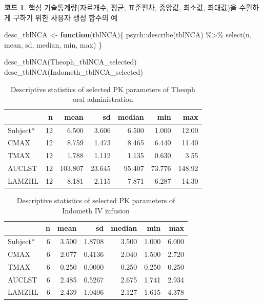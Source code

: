 \documentclass[
  11pt,
  krantz2, a4paper, twoside]{krantz}
\newenvironment{Shaded}{\begin{snugshade}}{\end{snugshade}}
\newcommand{\ControlFlowTok}[1]{\textcolor[rgb]{0.13,0.29,0.53}{\textbf{#1}}}
\newcommand{\FunctionTok}[1]{\textcolor[rgb]{0.00,0.00,0.00}{#1}}
\newcommand{\NormalTok}[1]{#1}
\newcommand{\OtherTok}[1]{\textcolor[rgb]{0.56,0.35,0.01}{#1}}
\newcommand{\SpecialCharTok}[1]{\textcolor[rgb]{0.00,0.00,0.00}{#1}}
\theoremstyle{definition}
\theoremstyle{definition}
\newtheorem{example}{코드}[chapter]
\theoremstyle{definition}
\theoremstyle{definition}
\theoremstyle{remark}
\begin{document}
\begin{example}
\protect\hypertarget{exm:desctblnca}{}{\label{exm:desctblnca} }핵심 기술통계량(자료개수, 평균, 표준편차, 중앙값, 최소값, 최대값)을 수월하게 구하기 위한 사용자 생성 함수의 예
\end{example}
\vspace{-2ex}

\begin{Shaded}
\begin{Highlighting}[]
\NormalTok{desc\_tblNCA }\OtherTok{\textless{}{-}} \ControlFlowTok{function}\NormalTok{(tblNCA)\{}
\NormalTok{  psych}\SpecialCharTok{::}\FunctionTok{describe}\NormalTok{(tblNCA) }\SpecialCharTok{\%\textgreater{}\%}
    \FunctionTok{select}\NormalTok{(n, mean, sd, median, min, max)}
\NormalTok{\}}
\end{Highlighting}
\end{Shaded}

\begin{Shaded}
\begin{Highlighting}[]
\FunctionTok{desc\_tblNCA}\NormalTok{(Theoph\_tblNCA\_selected)}
\FunctionTok{desc\_tblNCA}\NormalTok{(Indometh\_tblNCA\_selected)}
\end{Highlighting}
\end{Shaded}

\begin{table}

\caption{\label{tab:theodesc}Descriptive statistics of selected PK parameters of Theoph oral administration}
\centering
\begin{tabular}[t]{lrrrrrr}
\toprule
  & n & mean & sd & median & min & max\\
\midrule
Subject* & 12 & 6.500 & 3.606 & 6.500 & 1.000 & 12.00\\
CMAX & 12 & 8.759 & 1.473 & 8.465 & 6.440 & 11.40\\
TMAX & 12 & 1.788 & 1.112 & 1.135 & 0.630 & 3.55\\
AUCLST & 12 & 103.807 & 23.645 & 95.407 & 73.776 & 148.92\\
LAMZHL & 12 & 8.181 & 2.115 & 7.871 & 6.287 & 14.30\\
\bottomrule
\end{tabular}
\end{table}

\begin{table}

\caption{\label{tab:indodesc}Descriptive statistics of selected PK parameters of Indometh IV infusion}
\centering
\begin{tabular}[t]{lrrrrrr}
\toprule
  & n & mean & sd & median & min & max\\
\midrule
Subject* & 6 & 3.500 & 1.8708 & 3.500 & 1.000 & 6.000\\
CMAX & 6 & 2.077 & 0.4136 & 2.040 & 1.500 & 2.720\\
TMAX & 6 & 0.250 & 0.0000 & 0.250 & 0.250 & 0.250\\
AUCLST & 6 & 2.485 & 0.5267 & 2.675 & 1.741 & 2.934\\
LAMZHL & 6 & 2.439 & 1.0406 & 2.127 & 1.615 & 4.378\\
\bottomrule
\end{tabular}
\end{table}
\end{document}
